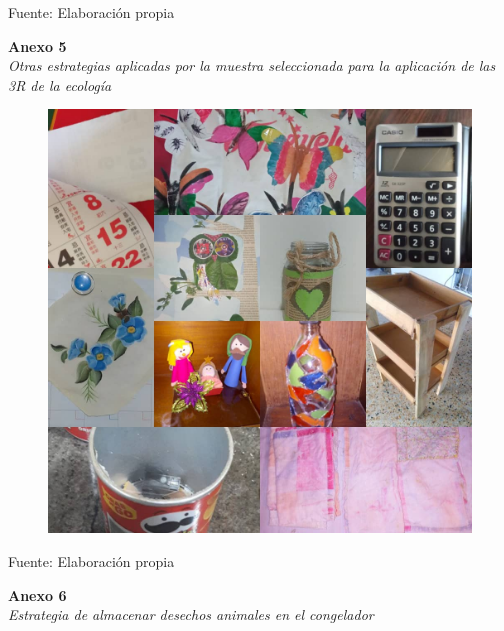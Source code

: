 \setlength{\parindent}{0ex}

Fuente: Elaboración propia

\newpage

\textbf{Anexo 5} \\
\textit{Otras estrategias aplicadas por la muestra seleccionada para la aplicación de las 3R de la ecología}

\begin{figure}[!ht]
    \centering
    \includegraphics[width=15cm]{Media/Fotos/Foto 1 otros.jpeg}
    \label{fig:anexo5}
\end{figure}

\setlength{\parindent}{0ex}

Fuente: Elaboración propia

\newpage

\textbf{Anexo 6} \\
\textit{Estrategia de almacenar desechos animales en el congelador}

